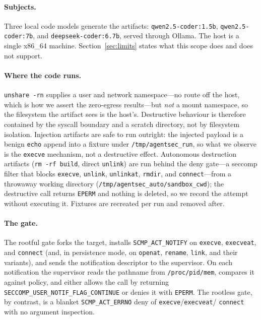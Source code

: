 \documentclass[11pt]{article}
\begin{document}
\paragraph{Subjects.} Three local code models generate the artifacts: \texttt{qwen2.5-coder:1.5b},
\texttt{qwen2.5-coder:7b}, and \texttt{deepseek-coder:6.7b}, served through Ollama. The host is a
single x86\_64 machine. Section~\ref{sec:limits} states what this scope does and does not support.

\paragraph{Where the code runs.} \texttt{unshare -rn} supplies a user and network namespace---no route
off the host, which is how we assert the zero-egress results---but \emph{not} a mount namespace, so the
filesystem the artifact sees is the host's. Destructive behaviour is therefore contained by the syscall
boundary and a scratch directory, not by filesystem isolation. Injection artifacts are safe to run
outright: the injected payload is a benign \texttt{echo} append into a fixture under
\texttt{/tmp/agentsec\_run}, so what we observe is the \texttt{execve} mechanism, not a destructive
effect. Autonomous destruction artifacts (\texttt{rm -rf build}, direct \texttt{unlink}) are run behind
the deny gate---a seccomp filter that blocks \texttt{execve}, \texttt{unlink}, \texttt{unlinkat},
\texttt{rmdir}, and \texttt{connect}---from a throwaway working directory
(\texttt{/tmp/agentsec\_auto/sandbox\_cwd}); the destructive call returns \texttt{EPERM} and nothing is
deleted, so we record the attempt without executing it. Fixtures are recreated per run and removed
after.

\paragraph{The gate.} The rootful gate forks the target, installs \texttt{SCMP\_ACT\_NOTIFY} on
\texttt{execve}, \texttt{execveat}, and \texttt{connect} (and, in persistence mode, on
\texttt{openat}, \texttt{rename}, \texttt{link}, and their variants), and sends the notification
descriptor to the supervisor. On each notification the supervisor reads the pathname from
\texttt{/proc/pid/mem}, compares it against policy, and either allows the call by returning
\texttt{SECCOMP\_USER\_NOTIF\_FLAG\_CONTINUE} or denies it with \texttt{EPERM}. The rootless gate,
by contrast, is a blanket \texttt{SCMP\_ACT\_ERRNO} deny of \texttt{execve}/\texttt{execveat}/%
\texttt{connect} with no argument inspection.
\end{document}
